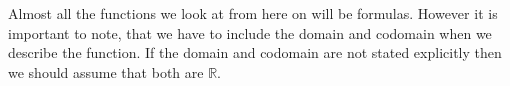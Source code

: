 Almost all the functions we look at from here on will be formulas. However it
is important to note, that we have to include the domain and codomain when we
describe the function. If the domain and codomain are not stated explicitly then
we should assume that both are $\mathbb{R}$.

